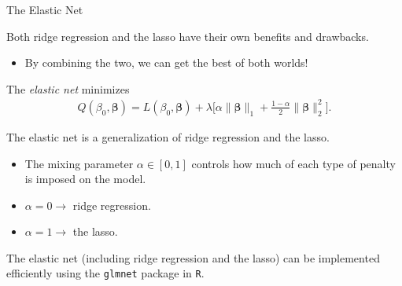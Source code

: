 \documentclass[8pt]{beamer}
\newcommand{\mys}{\vspace{0.5cm} %
}
\newcommand{\mysa}{\vspace{0.2cm} %
}
\begin{document}
\begin{frame}{The Elastic Net}

Both ridge regression and the lasso have their own benefits and drawbacks. 
\begin{itemize}
    \item By combining the two, we can get the best of both worlds!
\end{itemize} \mys

The \textit{elastic net} minimizes 
\begin{align}
    \label{enet}
    Q(\beta_0, \bm{\beta}) = L(\beta_0, \bm{\beta})
    + \lambda \Big[ \alpha \| \bm{\beta} \|_{1} + \frac{1 - \alpha}{2} \|\bm{\beta}\|_{2}^{2} \Big].
\end{align} \mysa

The elastic net is a generalization of ridge regression and the lasso.
\begin{itemize}
    \item The mixing parameter $\alpha \in [0,1]$ controls how much of each type of penalty is imposed on the model.
    \item $\alpha = 0 \to$ ridge regression.
    \item $\alpha = 1 \to$ the lasso.
\end{itemize} \mys

The elastic net (including ridge regression and the lasso) can be implemented efficiently using the \texttt{glmnet} package in \texttt{R}. %
    
\end{frame}
\end{document}
